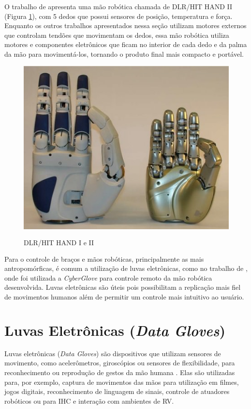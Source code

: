 O trabalho de  apresenta uma mão robótica chamada de DLR/HIT HAND II (Figura \ref{fig:dex_hand}), com 5 dedos que possui sensores de posição, temperatura e força. Enquanto os outros trabalhos apresentados nessa seção utilizam motores externos que controlam tendões que movimentam os dedos, essa mão robótica utiliza motores e componentes eletrônicos que ficam no interior de cada dedo e da palma da mão para movimentá-los, tornando o produto final mais compacto e portável.

\begin{figure}[H]
  \setlength{\abovecaptionskip}{0pt}
  \setlength{\belowcaptionskip}{0pt}
  \caption[DLR/HIT HAND I e II]{DLR/HIT HAND I e II}
  \centering
  \includegraphics[width=.5\textwidth]{imagem/dex_hand}
  \captionsetup{justification=centering}
  \label{fig:dex_hand}
\end{figure}

Para o controle de braços e mãos robóticas, principalmente as mais antropomórficas, é comum a utilização de luvas eletrônicas, como no trabalho de , onde foi utilizada a \textit{CyberGlove} para controle remoto da mão robótica desenvolvida. Luvas eletrônicas são úteis pois possibilitam a replicação mais fiel de movimentos humanos além de permitir um controle mais intuitivo ao usuário.

\section{Luvas Eletrônicas (\textit{Data Gloves})}
\label{sec:luv}
Luvas eletrônicas (\textit{Data Gloves}) são dispositivos que utilizam sensores de movimento, como acelerômetros, giroscópios ou sensores de flexibilidade, para reconhecimento ou reprodução de gestos da mão humana \cite{kim20093}. Elas são utilizadas para, por exemplo, captura de movimentos das mãos para utilização em filmes, jogos digitais, reconhecimento de linguagem de sinais, controle de atuadores robóticos ou para \ac{IHC} e interação com ambientes de \ac{RV}.

